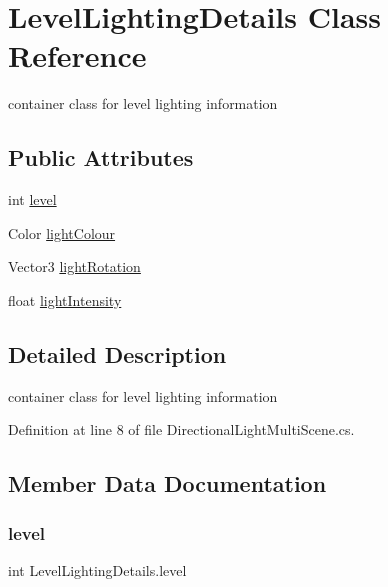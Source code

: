 \hypertarget{class_level_lighting_details}{}\section{Level\+Lighting\+Details Class Reference}
\label{class_level_lighting_details}


container class for level lighting information  


\subsection*{Public Attributes}
\begin{DoxyCompactItemize}
\item 
int \mbox{\hyperlink{class_level_lighting_details_a597f5b0a68e38c4d81286189433e1347}{level}}
\item 
Color \mbox{\hyperlink{class_level_lighting_details_abdef512d28a859fe2b220a9564bc3cb3}{light\+Colour}}
\item 
Vector3 \mbox{\hyperlink{class_level_lighting_details_a0449aa3fb9c9eb97d21cdcb370861b70}{light\+Rotation}}
\item 
float \mbox{\hyperlink{class_level_lighting_details_a31bb81f833ada29e3202af922c2e85c1}{light\+Intensity}}
\end{DoxyCompactItemize}


\subsection{Detailed Description}
container class for level lighting information 



Definition at line 8 of file Directional\+Light\+Multi\+Scene.\+cs.



\subsection{Member Data Documentation}
\mbox{\label{class_level_lighting_details_a597f5b0a68e38c4d81286189433e1347}} 
\subsubsection{\texorpdfstring{level}{level}}
{\footnotesize\ttfamily int Level\+Lighting\+Details.\+level}



